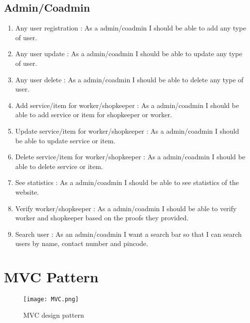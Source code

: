 \documentclass[conference]{IEEEtran}
\begin{document}
\subsection{Admin/Coadmin}
\begin{enumerate}
    \item Any user registration : As a admin/coadmin I should be able to add any type of user.
    \item Any user update : As a admin/coadmin I should be able to update any type of user.
    \item Any user delete : As a admin/coadmin I should be able to delete any type of user.
    \item Add service/item for worker/shopkeeper : As a admin/coadmin I should be able to add service or item for shopkeeper or worker.
    \item Update service/item for worker/shopkeeper : As a admin/coadmin I should be able to update service or item.
    \item Delete service/item for worker/shopkeeper : As a admin/coadmin I should be able to delete service or item.
    \item See statistics : As a admin/coadmin I should be able to see statistics of the website.
    \item Verify worker/shopkeeper : As a admin/coadmin I should be able to verify worker and shopkeeper based on the proofs they provided.
    \item Search user : As an admin/coadmin I want a search bar so that I can search users by name, contact number and pincode.
\end{enumerate}





\vspace{1cm}
\section{MVC Pattern}
\begin{figure}[H]
    \centering
    \texttt{[image: MVC.png]}
    \caption{MVC design pattern}
    \label{fig:mvc}
\end{figure}
\end{document}
